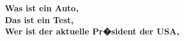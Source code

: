 \documentclass[NeuerVersuch]{article}
\begin{document}
\textbf{Was ist ein Auto,}\\
\textbf{Das ist ein Test,}\\
\textbf{Wer ist der aktuelle Pr�sident der USA,}\\
\end{document}
